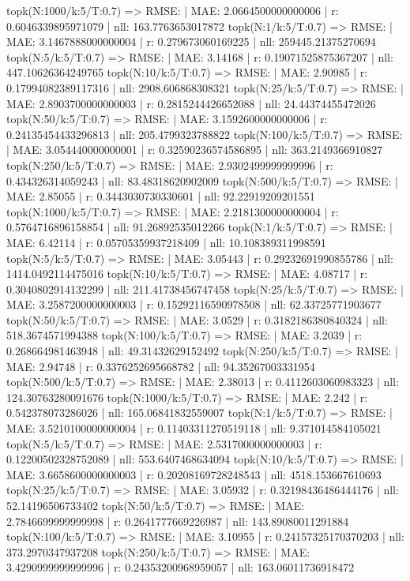 topk(N:1000/k:5/T:0.7) => RMSE: | MAE: 2.0664500000000006 | r: 0.6046339895971079 | nll: 163.7763653017872
topk(N:1/k:5/T:0.7) => RMSE: | MAE: 3.1467888000000004 | r: 0.279673060169225 | nll: 259445.21375270694
topk(N:5/k:5/T:0.7) => RMSE: | MAE: 3.14168 | r: 0.19071525875367207 | nll: 447.10626364249765
topk(N:10/k:5/T:0.7) => RMSE: | MAE: 2.90985 | r: 0.17994082389117316 | nll: 2908.606868308321
topk(N:25/k:5/T:0.7) => RMSE: | MAE: 2.8903700000000003 | r: 0.2815244426652088 | nll: 24.44374455472026
topk(N:50/k:5/T:0.7) => RMSE: | MAE: 3.1592600000000006 | r: 0.24135454433296813 | nll: 205.4799323788822
topk(N:100/k:5/T:0.7) => RMSE: | MAE: 3.054440000000001 | r: 0.32590236574586895 | nll: 363.2149366910827
topk(N:250/k:5/T:0.7) => RMSE: | MAE: 2.9302499999999996 | r: 0.434326314059243 | nll: 83.48318620902009
topk(N:500/k:5/T:0.7) => RMSE: | MAE: 2.85055 | r: 0.3443030730330601 | nll: 92.22919209201551
topk(N:1000/k:5/T:0.7) => RMSE: | MAE: 2.2181300000000004 | r: 0.5764716896158854 | nll: 91.26892535012266
topk(N:1/k:5/T:0.7) => RMSE: | MAE: 6.42114 | r: 0.05705359937218409 | nll: 10.108389311998591
topk(N:5/k:5/T:0.7) => RMSE: | MAE: 3.05443 | r: 0.29232691990855786 | nll: 1414.0492114475016
topk(N:10/k:5/T:0.7) => RMSE: | MAE: 4.08717 | r: 0.3040802914132299 | nll: 211.41738456747458
topk(N:25/k:5/T:0.7) => RMSE: | MAE: 3.2587200000000003 | r: 0.15292116590978508 | nll: 62.33725771903677
topk(N:50/k:5/T:0.7) => RMSE: | MAE: 3.0529 | r: 0.3182186380840324 | nll: 518.3674571994388
topk(N:100/k:5/T:0.7) => RMSE: | MAE: 3.2039 | r: 0.268664981463948 | nll: 49.31432629152492
topk(N:250/k:5/T:0.7) => RMSE: | MAE: 2.94748 | r: 0.3376252695668782 | nll: 94.35267003331954
topk(N:500/k:5/T:0.7) => RMSE: | MAE: 2.38013 | r: 0.4112603060983323 | nll: 124.30763280091676
topk(N:1000/k:5/T:0.7) => RMSE: | MAE: 2.242 | r: 0.542378073286026 | nll: 165.06841832559007
topk(N:1/k:5/T:0.7) => RMSE: | MAE: 3.5210100000000004 | r: 0.11403311270519118 | nll: 9.371014584105021
topk(N:5/k:5/T:0.7) => RMSE: | MAE: 2.5317000000000003 | r: 0.12200502328752089 | nll: 553.6407468634094
topk(N:10/k:5/T:0.7) => RMSE: | MAE: 3.6658600000000003 | r: 0.20208169728248543 | nll: 4518.153667610693
topk(N:25/k:5/T:0.7) => RMSE: | MAE: 3.05932 | r: 0.32198436486444176 | nll: 52.14196506733402
topk(N:50/k:5/T:0.7) => RMSE: | MAE: 2.7846699999999998 | r: 0.2641777669226987 | nll: 143.89080011291884
topk(N:100/k:5/T:0.7) => RMSE: | MAE: 3.10955 | r: 0.24157325170370203 | nll: 373.2970347937208
topk(N:250/k:5/T:0.7) => RMSE: | MAE: 3.4290999999999996 | r: 0.24353200968959057 | nll: 163.06011736918472
